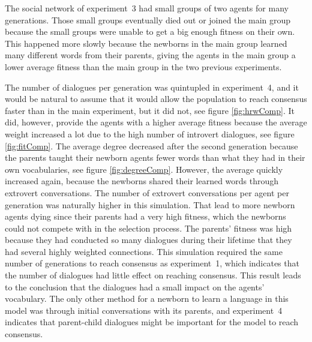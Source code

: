 The social network of experiment~3 had small groups of two agents for many generations. Those small groups eventually died out or joined the main group because the small groups were unable to get a big enough fitness on their own. This happened more slowly because the newborns in the main group learned many different words from their parents, giving the agents in the main group a lower average fitness than the main group in the two previous experiments.

The number of dialogues per generation was quintupled in experiment~4, and it would be natural to assume that it would allow the population to reach consensus faster than in the main experiment, but it did not, see figure \ref{fig:hrwComp}. It did, however, provide the agents with a higher average fitness because the average weight increased a lot due to the high number of introvert dialogues, see figure \ref{fig:fitComp}. The average degree decreased after the second generation because the parents taught their newborn agents fewer words than what they had in their own vocabularies, see figure \ref{fig:degreeComp}. However, the average quickly increased again, because the newborns shared their learned words through extrovert conversations. The number of extrovert conversations per agent per generation was naturally higher in this simulation. That lead to more newborn agents dying since their parents had a very high fitness, which the newborns could not compete with in the selection process. The parents' fitness was high because they had conducted so many dialogues during their lifetime that they had several highly weighted connections. This simulation required the same number of generations to reach consensus as experiment~1, which indicates that the number of dialogues had little effect on reaching consensus. This result leads to the conclusion that the dialogues had a small impact on the agents' vocabulary. The only other method for a newborn to learn a language in this model was through initial conversations with its parents, and experiment~4 indicates that parent-child dialogues might be important for the model to reach consensus.  

